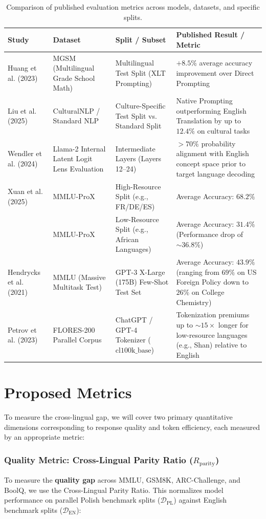 \documentclass{article}
\begin{document}
\begin{table}[htbp]
\centering
\caption{Comparison of published evaluation metrics across models, datasets, and specific splits.}
\label{tab:published_numbers}
\begin{tabular}{p{4.5cm} p{3.5cm} p{2.5cm} p{4.5cm}}
\toprule
\textbf{Study} & \textbf{Dataset} & \textbf{Split / Subset} & \textbf{Published Result / Metric} \\
\midrule
Huang et al. (2023) & MGSM (Multilingual Grade School Math) & Multilingual Test Split (XLT Prompting) & $+8.5\%$ average accuracy improvement over Direct Prompting \\
\midrule
Liu et al. (2025) & CulturalNLP / Standard NLP & Culture-Specific Test Split vs. Standard Split & Native Prompting outperforming English Translation by up to $12.4\%$ on cultural tasks \\
\midrule
Wendler et al. (2024) & Llama-2 Internal Latent Logit Lens Evaluation & Intermediate Layers (Layers 12--24) & $>70\%$ probability alignment with English concept space prior to target language decoding \\
\midrule
Xuan et al. (2025) & MMLU-ProX & High-Resource Split (e.g., FR/DE/ES) & Average Accuracy: $68.2\%$ \\
 & MMLU-ProX & Low-Resource Split (e.g., African Languages) & Average Accuracy: $31.4\%$ (Performance drop of $\sim36.8\%$) \\
\midrule
Hendrycks et al. (2021) & MMLU (Massive Multitask Test) & GPT-3 X-Large (175B) Few-Shot Test Set & Average Accuracy: $43.9\%$ (ranging from $69\%$ on US Foreign Policy down to $26\%$ on College Chemistry)\\
\midrule
Petrov et al. (2023) & FLORES-200 Parallel Corpus & ChatGPT / GPT-4 Tokenizer ($\text{cl100k\_base}$) & Tokenization premiums up to $\sim15\times$ longer for low-resource languages (e.g., Shan) relative to English \\
\bottomrule
\end{tabular}
\end{table}
\section{Proposed Metrics}
To measure the cross-lingual gap, we will cover two primary quantitative dimensions corresponding to response quality and token efficiency, each measured by an appropriate metric:

\subsubsection{Quality Metric: Cross-Lingual Parity Ratio ($R_{\text{parity}}$)}
To measure the \textbf{quality gap} across MMLU, GSM8K, ARC-Challenge, and BoolQ, we use the Cross-Lingual Parity Ratio. This normalizes model performance on parallel Polish benchmark splits ($\mathcal{D}_{\text{PL}}$) against English benchmark splits ($\mathcal{D}_{\text{EN}}$):
\end{document}
